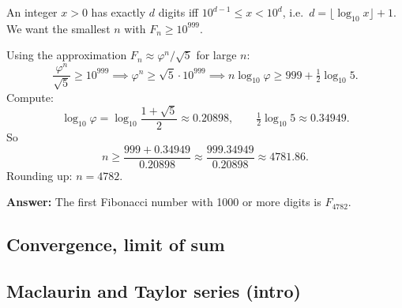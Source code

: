 \begin{example}
An integer $x > 0$ has exactly $d$ digits iff $10^{d-1} \le x < 10^d$, i.e.\ $d = \lfloor\log_{10} x\rfloor + 1$. We want the smallest $n$ with $F_n \ge 10^{999}$.

Using the approximation $F_n \approx \varphi^n/\sqrt{5}$ for large $n$:
\[
\frac{\varphi^n}{\sqrt{5}} \ge 10^{999}
\implies \varphi^n \ge \sqrt{5}\cdot 10^{999}
\implies n\log_{10}\varphi \ge 999 + \tfrac{1}{2}\log_{10}5.
\]
Compute:
\[
\log_{10}\varphi = \log_{10}\!\frac{1+\sqrt{5}}{2} \approx 0.20898, \qquad \tfrac{1}{2}\log_{10}5 \approx 0.34949.
\]
So
\[
n \ge \frac{999 + 0.34949}{0.20898} \approx \frac{999.34949}{0.20898} \approx 4781.86.
\]
Rounding up: $n = 4782$.

\textbf{Answer:} The first Fibonacci number with 1000 or more digits is $F_{4782}$.
\end{example}

\subsection{Convergence, limit of sum}


\subsection{Maclaurin and Taylor series (intro)}

